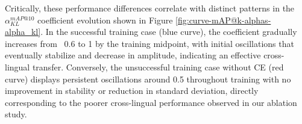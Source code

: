 Critically, these performance differences correlate with distinct patterns in the $\alpha_{KL}^{mAP@10}$ coefficient evolution shown in Figure \ref{fig:curve-mAP@k-alphas-alpha_kl}. In the successful training case (blue curve), the coefficient gradually increases from ~0.6 to 1 by the training midpoint, with initial oscillations that eventually stabilize and decrease in amplitude, indicating an effective cross-lingual transfer. Conversely, the unsuccessful training case without CE (red curve) displays persistent oscillations around 0.5 throughout training with no improvement in stability or reduction in standard deviation, directly corresponding to the poorer cross-lingual performance observed in our ablation study.